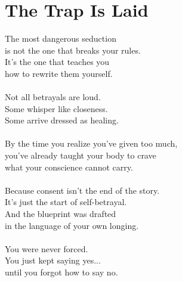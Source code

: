 \part{The Trap Is Laid}

\vfill

\begin{flushright}
  \Large
  The most dangerous seduction\\
  is not the one that breaks your rules.\\
  It’s the one that teaches you\\ 
  how to rewrite them yourself.\\
  \ \\
  Not all betrayals are loud.\\
  Some whisper like closeness.\\
  Some arrive dressed as healing.\\
  \ \\
  By the time you realize you've given too much,\\
  you’ve already taught your body to crave\\
  what your conscience cannot carry.\\
  \ \\
  Because consent isn't the end of the story.\\
  It's just the start of self-betrayal.\\
  And the blueprint was drafted\\
  in the language of your own longing.\\
  \ \\
  You were never forced.\\
  You just kept saying yes...\\
  until you forgot how to say no.\\
\end{flushright}


